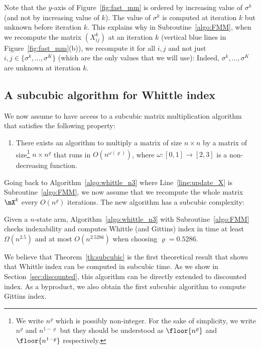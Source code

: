 Note that the $y$-axis of Figure~\ref{fig:fast_mm} is ordered by increasing value of $\sigma^k$ (and not by increasing value of $k$). The value of $\sigma^k$ is computed at iteration $k$ but unknown before iteration $k$. This explains why in Subroutine~\ref{algo:FMM}, when we recompute the matrix $(X^{k}_{ij})$ at an iteration $k$ (vertical blue lines in Figure~\ref{fig:fast_mm}(b)), we recompute it for all $i,j$ and not just $i,j\in\{\sigma^{k}, \dots, \sigma^K\}$ (which are the only values that we will use): Indeed, $\sigma^{k}, \dots, \sigma^K$ are unknown at iteration $k$. 

\subsection{A subcubic algorithm for Whittle index}

We now assume to have access to a subcubic matrix multiplication algorithm that satisfies the following property:
\begin{enumerate}[label=(FMM)]    
    \item \label{hypo:FMM} There exists an algorithm to multiply a matrix of size $n\times n$ by a matrix of size\footnote{We write $n^\varrho$ which is possibly non-integer. For the sake of simplicity, we write $n^\varrho$ and $n^{1-\varrho}$ but they should be understood as $\floor{n^\varrho}$ and $\floor{n^{1-\varrho}}$ respectively.} $n\times  n^\varrho $ that runs in $O(n^{\omega(\varrho)})$, where $\omega:[0,1]\to[2,3]$ is a non-decreasing function.
\end{enumerate}

Going back to Algorithm~\ref{algo:whittle_n3} where Line~\ref{line:update_X} is Subroutine~\ref{algo:FMM}, we now assume that we recompute the whole matrix $\mX^k$ every $O(n^\varrho)$ iterations. The new algorithm has a subcubic complexity:

\begin{thm}
    \label{th:subcubic}
    Given a $n$-state arm, Algorithm~\ref{algo:whittle_n3} with Subroutine~\ref{algo:FMM} checks indexability and computes Whittle (and Gittins) index in time at least $\Omega(n^{2.5})$ and at most $O(n^{2.5286})$ when choosing $\varrho=0.5286$.
\end{thm}

We believe that Theorem~\ref{th:subcubic} is the first theoretical result that shows that Whittle index can be computed in subcubic time. As we show in Section~\ref{sec:discounted}, this algorithm can be directly extended to discounted index. As a byproduct, we also obtain the first subcubic algorithm to compute Gittins index.


